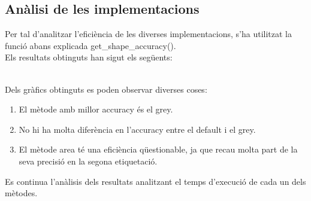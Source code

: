 \documentclass[a4paper, 11pt]{article}
\begin{document}
\subsection{Anàlisi de les implementacions}
Per tal d'analitzar l'eficiència de les diverses implementacions, s'ha utilitzat la funció abans explicada \textcolor{funcblue}{get\_shape\_accuracy()}.\\
Els resultats obtinguts han sigut els següents:
\begin{figure}[h]
 \centering
\end{figure}\\
Dels gràfics obtinguts es poden observar diverses coses:
\begin{enumerate}
    \item El mètode amb millor accuracy és el grey.
    \item No hi ha molta diferència en l'accuracy entre el default i el grey.
    \item El mètode area té una eficiència qüestionable, ja que recau molta part de la seva precisió en la segona etiquetació.
\end{enumerate}
Es continua l'anàlisis dels resultats analitzant el temps d'execució de cada un dels mètodes.\\
\end{document}
